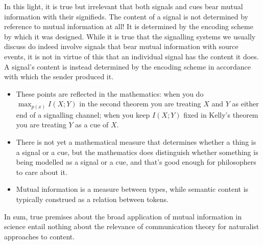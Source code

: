 In this light, it is true but irrelevant that both signals and cues bear mutual information with their signifieds. 
The content of a signal is not determined by reference to mutual information at all!
It is determined by the encoding scheme by which it was designed.
While it is true that the signalling systems we usually discuss do indeed involve signals that bear mutual information with source events, it is not in virtue of this that an individual signal has the content it does.
A signal's content is instead determined by the encoding scheme in accordance with which the sender produced it.


\begin{itemize}
    \item These points are reflected in the mathematics: when you do $\max_{p(x)}I(X;Y)$ in the second theorem you are treating $X$ and $Y$ as either end of a signalling channel; when you keep $I(X;Y)$ fixed in Kelly's theorem you are treating $Y$ as a cue of $X$.
    \item There is not yet a mathematical measure that determines whether a thing is a signal or a cue, but the mathematics does distinguish whether something is being modelled as a signal or a cue, and that's good enough for philosophers to care about it.
    \item Mutual information is a measure between types, while semantic content is typically construed as a relation between tokens.
\end{itemize}

In sum, true premises about the broad application of mutual information in science entail nothing about the relevance of communication theory for naturalist approaches to content.

